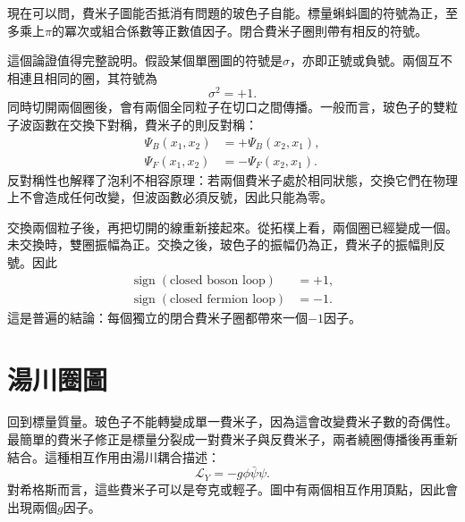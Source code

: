 現在可以問，費米子圖能否抵消有問題的玻色子自能。標量蝌蚪圖的符號為正，至多乘上\(\pi\)的冪次或組合係數等正數值因子。閉合費米子圈則帶有相反的符號。

\begin{classroomqa}
\end{classroomqa}

這個論證值得完整說明。假設某個單圈圖的符號是\(\sigma\)，亦即正號或負號。兩個互不相連且相同的圈，其符號為
\begin{equation}
\sigma^2=+1.
\end{equation}
同時切開兩個圈後，會有兩個全同粒子在切口之間傳播。一般而言，玻色子的雙粒子波函數在交換下對稱，費米子的則反對稱：
\begin{align}
\Psi_B(x_1,x_2)&=+\Psi_B(x_2,x_1),\\
\Psi_F(x_1,x_2)&=-\Psi_F(x_2,x_1).
\end{align}
反對稱性也解釋了泡利不相容原理：若兩個費米子處於相同狀態，交換它們在物理上不會造成任何改變，但波函數必須反號，因此只能為零。

交換兩個粒子後，再把切開的線重新接起來。從拓樸上看，兩個圈已經變成一個。未交換時，雙圈振幅為正。交換之後，玻色子的振幅仍為正，費米子的振幅則反號。因此
\begin{equation}
\begin{aligned}
\operatorname{sign}(\text{closed boson loop})&=+1,\\
\operatorname{sign}(\text{closed fermion loop})&=-1.
\end{aligned}
\end{equation}
這是普遍的結論：每個獨立的閉合費米子圈都帶來一個\(-1\)因子。

\section{湯川圈圖}

回到標量質量。玻色子不能轉變成單一費米子，因為這會改變費米子數的奇偶性。最簡單的費米子修正是標量分裂成一對費米子與反費米子，兩者繞圈傳播後再重新結合。這種相互作用由湯川耦合描述：
\begin{equation}
\mathcal L_Y=-g\phi\bar\psi\psi.
\end{equation}
對希格斯而言，這些費米子可以是夸克或輕子。圖中有兩個相互作用頂點，因此會出現兩個\(g\)因子。

